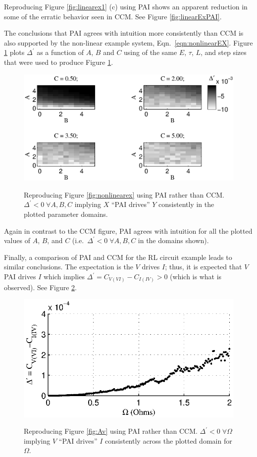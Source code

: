 \documentclass[twocolumn,aps,pre,groupedaddress]{revtex4-1}
\begin{document}
Reproducing Figure \ref{fig:linearex1} (c) using PAI shows an apparent reduction in some of the erratic behavior seen in CCM.  See Figure \ref{fig:linearExPAI}.

The conclusions that PAI agrees with intuition more consistently than CCM is also supported by the non-linear example system, Eqn.\ \ref{eqn:nonlinearEX}.  Figure \ref{fig:nonlinearEXPAI} plots $\Delta^\prime$ as a function of $A$, $B$ and $C$ using of the same $E$, $\tau$, $L$, and step sizes that were used to produce Figure \ref{fig:nonlinearEXPAI}.
\begin{figure}[ht]
\includegraphics[scale=0.55]{NonLinearPAIEx.eps} \\
\caption{Reproducing Figure \ref{fig:nonlinearex} using PAI rather than CCM.  $\Delta^\prime<0\;\forall A,B,C$ implying $X$ ``PAI drives'' $Y$ consistently in the plotted parameter domains.}
\label{fig:nonlinearEXPAI}
\end{figure}
Again in contrast to the CCM figure, PAI agrees with intuition for all the plotted values of $A$, $B$, and $C$ (i.e.\ $\Delta^\prime<0\;\forall A,B,C$ in the domains shown).

Finally, a comparison of PAI and CCM for the RL circuit example leads to similar conclusions.  The expectation is the $V$ drives $I$; thus, it is expected that $V$ PAI drives $I$ which implies $\Delta^\prime = C_{V(VI)} - C_{I(IV)} > 0$ (which is what is observed).  See Figure \ref{fig:AvPAI}.
\begin{figure}[ht]
\includegraphics[scale=0.8]{RLCircuitVaryV_FreqPAI.eps} \\
\caption{Reproducing Figure \ref{fig:Av} using PAI rather than CCM.  $\Delta^\prime<0\;\forall \Omega$ implying $V$ ``PAI drives'' $I$ consistently across the plotted domain for $\Omega$.}
\label{fig:AvPAI}
\end{figure}
\end{document}
